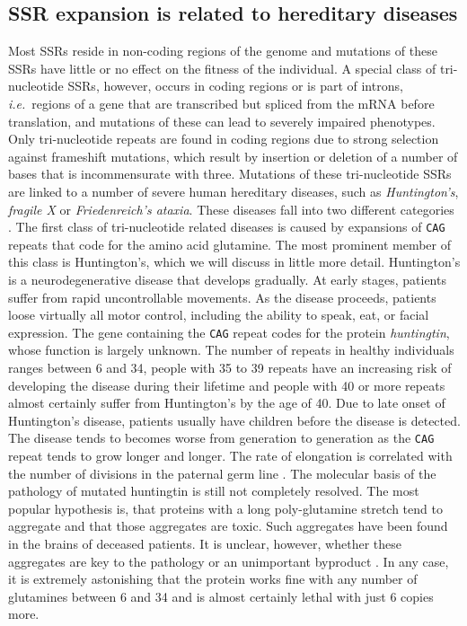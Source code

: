 \subsection{SSR expansion is related to hereditary diseases}
Most SSRs reside in non-coding regions of the genome and mutations of these SSRs
have little or no effect on the fitness of the individual. A special class of tri-nucleotide SSRs, however, occurs in 
coding regions or is part of introns, \emph{i.e.}~regions of a gene that are transcribed but spliced from the 
mRNA before translation, and mutations of these can lead to severely impaired phenotypes. 
Only tri-nucleotide repeats are found in coding regions due to strong selection against
frameshift mutations, which result by insertion or deletion of a number of bases that is incommensurate 
with three. Mutations of these tri-nucleotide SSRs are linked to a number of severe human hereditary
diseases, such as \emph{Huntington's}, \emph{fragile X} or \emph{Friedenreich's ataxia}.
These diseases fall into two different categories \cite{Reddy_COCEB_97}. 
The first class of tri-nucleotide related diseases is caused 
by expansions of \texttt{CAG} repeats that code for the amino acid glutamine. The most prominent
member of this class is Huntington's, which we will discuss in little more detail.
Huntington's is a neurodegenerative disease that develops gradually. At early stages, 
patients suffer from rapid uncontrollable movements. As the disease proceeds, 
patients loose virtually all motor control, including the ability to speak, eat, or facial expression. 
The gene containing the \texttt{CAG} repeat codes for the protein \emph{huntingtin}, whose
function is largely unknown. The number of repeats in healthy individuals ranges between 
6 and 34, people with 35 to 39 repeats have an increasing risk of developing the disease during
their lifetime and people with 40 or more repeats almost certainly suffer from Huntington's by the 
age of 40. Due to late onset of Huntington's disease, patients usually have children before
the disease is detected. The disease tends to becomes worse from generation to generation as the 
\texttt{CAG} repeat tends to grow longer and longer. The rate of elongation is correlated with 
the number of divisions in the paternal germ line \cite{Kandel_00}.
The molecular basis of the pathology of mutated huntingtin is still not completely 
resolved. The most popular hypothesis is, that proteins with a long poly-glutamine stretch tend
to aggregate and that those aggregates are toxic. Such aggregates have been found in the brains
of deceased patients. It is unclear, however, whether these aggregates are key to the pathology
or an unimportant byproduct \cite{Bates_Lancet_03}. In any case, it is extremely astonishing that 
the protein works fine with any number of glutamines between 6 and 34 and is almost certainly lethal 
with just 6 copies more.

